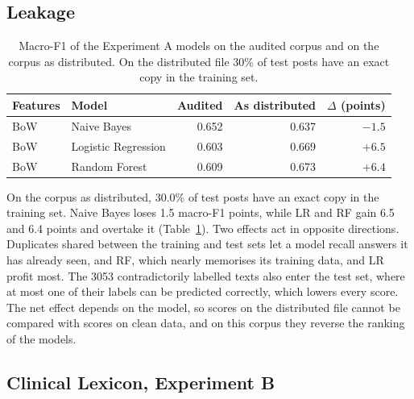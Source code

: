 \documentclass[conference]{IEEEtran}
\begin{document}
\subsection{Leakage}

\begin{table}[!htbp]
\centering
\caption{Macro-F1 of the Experiment A models on the audited corpus and on the corpus as distributed. On the distributed file 30\% of test posts have an exact copy in the training set.}
\label{tab:leak}
\begin{tabular}{llrrr}
\toprule
Features & Model & Audited & As distributed & $\Delta$ (points) \\
\midrule
BoW & Naive Bayes & 0.652 & 0.637 & $-1.5$ \\
BoW & Logistic Regression & 0.603 & 0.669 & $+6.5$ \\
BoW & Random Forest & 0.609 & 0.673 & $+6.4$ \\
\bottomrule
\end{tabular}
\end{table}

On the corpus as distributed, 30.0\% of test posts have an exact copy in the training set. Naive Bayes loses 1.5 macro-F1 points, while LR and RF gain 6.5 and 6.4 points and overtake it (Table~\ref{tab:leak}). Two effects act in opposite directions. Duplicates shared between the training and test sets let a model recall answers it has already seen, and RF, which nearly memorises its training data, and LR profit most. The \num{3053} contradictorily labelled texts also enter the test set, where at most one of their labels can be predicted correctly, which lowers every score. The net effect depends on the model, so scores on the distributed file cannot be compared with scores on clean data, and on this corpus they reverse the ranking of the models.

\subsection{Clinical Lexicon, Experiment B}\label{sec:lex}
\end{document}
